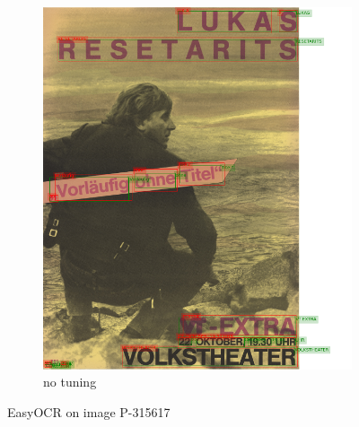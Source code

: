 \begin{figure}[hbtp!]
    \begin{subfigure}{\textwidth}
        \centering
        \includegraphics[scale=0.29]{obrazky/plakaty/result_easyOCR_vienna2_nosplit_notuning_nocorrection-83.png}
        \caption{no tuning}
        \label{Im3:ex:easy}
    \end{subfigure}
    \caption{EasyOCR on image P-315617}
    \label{Im3:ex:EasyOCR}
\end{figure}

